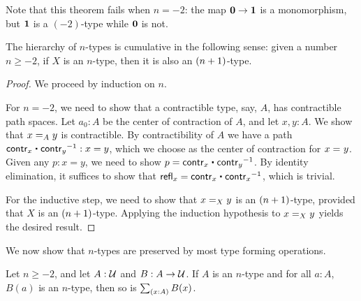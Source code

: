 Note that this theorem fails when $n=-2$: the map $\emptyt \to \unit$ is a monomorphism, but $\unit$ is a $(-2)$-type while $\emptyt$ is not.

\begin{thm}\label{thm:hlevel-cumulative}
 The hierarchy of $n$-types is cumulative in the following sense:
   given a number $n \geq -2$, if $X$ is an $n$-type, then it is also an $\nplusone$-type.
\end{thm}

\begin{proof}
 We proceed by induction on $n$.

 For $n = -2$, we need to show that a contractible type, say, $A$, has contractible path spaces.
       Let $a_0: A$ be the center of contraction of $A$, and let $x, y : A$. We show that $\id[A]{x}{y}$
       is contractible.
       By contractibility of $A$ we have a path $\contr_x \ct \opp{\contr_y} : x = y$, which we choose as
       the center of contraction for $\id{x}{y}$.
       Given any $p : x = y$, we need to show $p = \contr_x \ct \opp{\contr_y}$.
           By identity elimination, it suffices to show that
        $\refl{x} = \contr_x \ct \opp{\contr_x}$, which is trivial.

 For the inductive step, we need to show that $\id[X]{x}{y}$ is an $\nplusone$-type, provided
          that $X$ is an $\nplusone$-type. Applying the induction hypothesis to $\id[X]{x}{y}$
         yields the desired result.
\end{proof}


We now show that $n$-types are preserved by most type forming operations.

\begin{thm}\label{thm:ntypes-sigma}
 Let $n \geq -2$, and let $A : \type$ and $B : A \to \type$.
 If $A$ is an $n$-type and for all $a : A$, $B(a)$ is an $n$-type, then so is $\sm{x : A} B(x)$.
\end{thm}

